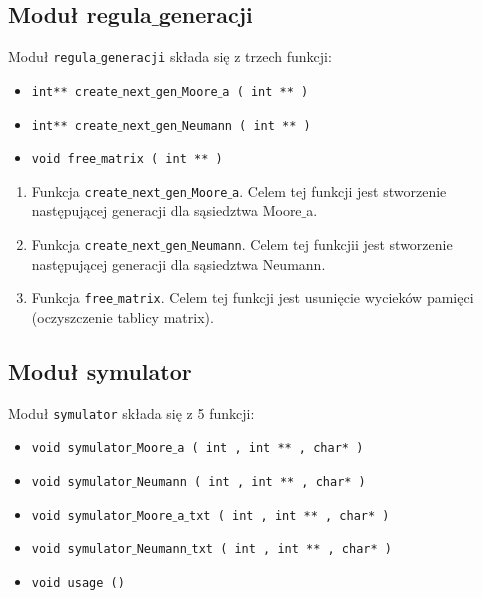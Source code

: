 \documentclass[a4paper, 12pt]{article}
\begin{document}
		\subsection{Moduł regula$\_$generacji}
			\hspace*{1cm} Moduł \texttt{regula$\_$generacji} składa się z trzech funkcji:
		\begin{itemize}
			\item \texttt{int** create$\_$next$\_$gen$\_$Moore$\_$a ( int ** )} 
			\item \texttt{int** create$\_$next$\_$gen$\_$Neumann ( int ** )} 
			\item \texttt{void free$\_$matrix ( int ** )}
		\end{itemize}
		
		\begin{enumerate}
			\item Funkcja \texttt{create$\_$next$\_$gen$\_$Moore$\_$a}. 
			Celem tej funkcji jest stworzenie następującej generacji dla sąsiedztwa Moore$\_$a.
			\item Funkcja \texttt{create$\_$next$\_$gen$\_$Neumann}. 
			Celem tej funkcjii jest stworzenie następującej generacji dla sąsiedztwa Neumann.
			\item Funkcja \texttt{free$\_$matrix}. 
			Celem tej funkcji jest usunięcie wycieków pamięci (oczyszczenie tablicy matrix).
		\end{enumerate}

		\subsection{Moduł symulator}
			\hspace*{1cm} Moduł \texttt{symulator} składa się z 5 funkcji:
		\begin{itemize}
			\item \texttt{void symulator$\_$Moore$\_$a ( int , int ** , char* )}
			\item \texttt{void symulator$\_$Neumann ( int , int ** , char* )}
			\item \texttt{void symulator$\_$Moore$\_$a$\_$txt ( int , int ** , char* )}
			\item \texttt{void symulator$\_$Neumann$\_$txt ( int , int ** , char* )}
			\item \texttt{void usage ()}
		\end{itemize}
		
\end{document}
